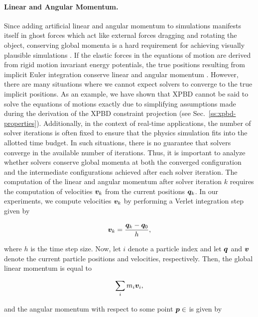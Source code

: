\paragraph{Linear and Angular Momentum.}
Since adding artificial linear and angular momentum to simulations manifests itself in ghost forces which act like external forces dragging and rotating the object, 
conserving global momenta is a hard requirement for achieving visually plausible simulations \cite{mueller2006}. If the elastic forces in the equations of motion are 
derived from rigid motion invariant energy potentials, the true positions resulting from implicit Euler integration 
conserve linear and angular momentum \cite{bouaziz2014}. However, there are many situations where we cannot expect solvers to converge to the true implicit positions. 
As an example, we have shown that XPBD cannot be said to solve the equations of motions exactly due to simplifying assumptions made during the derivation of the XPBD 
constraint projection (see Sec.\ \ref{ss:xpbd-properties}). Additionally, in the context of real-time applications, the number of solver iterations is often fixed to ensure 
that the physics simulation fits into the allotted time budget. In such situations, there is no guarantee that solvers converge in the available number of iterations. 
Thus, it is important to analyze whether solvers conserve global momenta at both the converged configuration and the intermediate configurations achieved after each 
solver iteration. The computation of the linear and angular momentum after solver iteration $k$ requires the computation of velocities $\bm{v}_k$ from the current 
positions $\bm{q}_k$. In our experiments, we compute velocities $\bm{v}_k$ by performing a Verlet integration step given by

\begin{equation}\label{eq:velocities}
    \bm{v}_k = \frac{\bm{q}_k - \bm{q}_0}{h},
\end{equation}

\noindent where $h$ is the time step size. Now, let $i$ denote a particle index and let $\bm{q}$ and $\bm{v}$ denote the current particle positions and velocities, 
respectively. Then, the global linear momentum is equal to 

\begin{equation}\label{eq:linear-momentum}
    \sum_i m_i \bm{v}_i,
\end{equation}

\noindent and the angular momentum with respect to some point $\bm{p} \in $ is given by 

